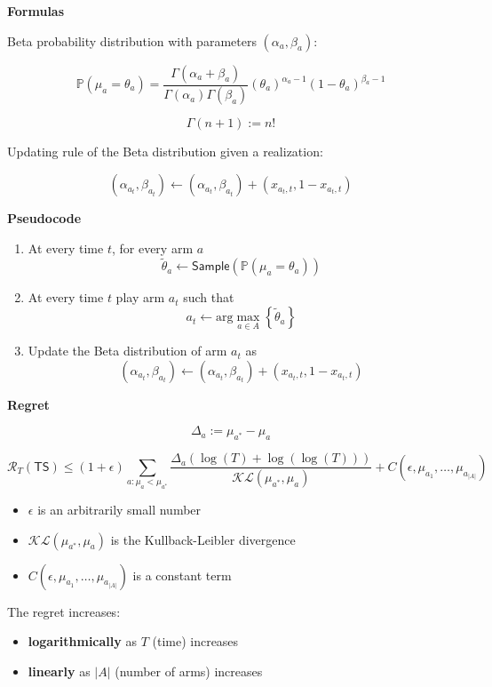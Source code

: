 \documentclass[10pt,a4paper]{article}
\begin{document}
\textbf{Formulas}

Beta probability distribution with parameters $(\alpha_a, \beta_a)$:

$$\mathbb{P}\left(\mu_{a}=\theta_{a}\right)=\frac{\Gamma\left(\alpha_{a}+\beta_{a}\right)}{\Gamma\left(\alpha_{a}\right) \Gamma\left(\beta_{a}\right)}\left(\theta_{a}\right)^{\alpha_{a}-1}\left(1-\theta_{a}\right)^{\beta_{a}-1}$$

$$\Gamma(n+1) := n!$$

Updating rule of the Beta distribution given a realization:

$$(\alpha_{a_t}, \beta_{a_t}) \leftarrow (\alpha_{a_t}, \beta_{a_t}) + (x_{a_t, t}, 1 - x_{a_t, t})$$
\newline

\textbf{Pseudocode}
\begin{shaded}
\begin{enumerate}
\item At every time $t$, for every arm $a$
$$\tilde{\theta}_a \leftarrow \mathsf{Sample}(\mathbb{P}(\mu_a = \theta_a))$$
\item At every time $t$ play arm $a_t$ such that
$$a_t \leftarrow \text{arg} \max_{a \in A} \left\{ \tilde{\theta}_a \right\}$$
\item Update the Beta distribution of arm $a_t$ as
$$(\alpha_{a_t}, \beta_{a_t}) \leftarrow (\alpha_{a_t}, \beta_{a_t}) + (x_{a_t, t}, 1 - x_{a_t, t})$$
\end{enumerate}
\end{shaded}

\textbf{Regret}

$$\Delta_{a} := \mu_{a^{*}} - \mu_{a}$$

$$\mathscr{R}_{T}(\mathsf{TS}) \leq(1+\epsilon) \sum_{a: \mu_{a}<\mu_{a^{*}}} \frac{\Delta_{a}(\log (T)+\log (\log (T)))}{\mathscr{KL} \left(\mu_{a^{*}}, \mu_{a}\right)}+C\left(\epsilon, \mu_{a_{1}}, \ldots, \mu_{a_{|A|}}\right)$$

\begin{itemize}
\item $\epsilon$ is an arbitrarily small number
\item $\mathscr{KL} \left(\mu_{a^{*}}, \mu_{a}\right)$ is the Kullback-Leibler divergence
\item $C\left(\epsilon, \mu_{a_{1}}, \ldots, \mu_{a_{|A|}}\right)$ is a constant term
\end{itemize}

The regret increases:

\begin{itemize}
\item \textbf{logarithmically} as $T$ (time) increases
\item \textbf{linearly} as $|A|$ (number of arms) increases
\end{itemize}
\end{document}
